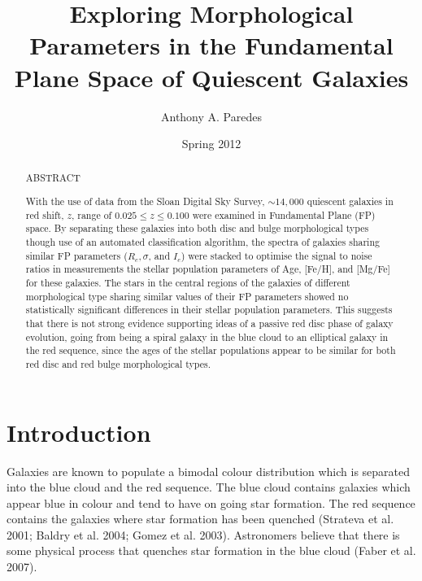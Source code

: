 \documentclass[showcase, preprintnumbers, amsmath, amssymb, bibnotes, 12pt]{revtex4}
\begin{document}
\title{Exploring Morphological Parameters in the Fundamental Plane Space of Quiescent Galaxies}
\author{Anthony A. Paredes}
\date{Spring 2012}

\begin{abstract}
\begin{center}
ABSTRACT
\end{center}
With the use of data from the Sloan Digital Sky Survey, $\sim 14,000$ quiescent galaxies in red shift, $z$, range of $0.025\leq z\leq0.100$ were examined in Fundamental Plane (FP) space. By separating these galaxies into both disc and bulge morphological types though use of an automated classification algorithm, the spectra of galaxies sharing similar FP parameters ($R_e, \sigma$, and  $I_e$) were stacked to optimise the signal to noise ratios in measurements the stellar population parameters of Age, [Fe/H], and [Mg/Fe] for these galaxies. The stars in the central regions of the galaxies of different morphological type sharing similar values of their FP parameters showed no statistically significant differences in their stellar population parameters. This suggests that there is not strong evidence supporting ideas of a passive red disc phase of galaxy evolution, going from being a spiral galaxy in the blue cloud to an elliptical galaxy in the red sequence, since the ages of the stellar populations appear to be similar for both red disc and red bulge morphological types.
\end{abstract}



\maketitle

\section{Introduction}

Galaxies are known to populate a bimodal colour distribution which is separated into the blue cloud and the red sequence. The blue cloud contains galaxies which appear blue in colour and tend to have on going star formation. The red sequence contains the galaxies where star formation has been quenched (Strateva et al. 2001; Baldry et al. 2004; Gomez et al. 2003). Astronomers believe that there is some physical process that quenches star formation in the blue cloud (Faber et al. 2007). %
\end{document}
